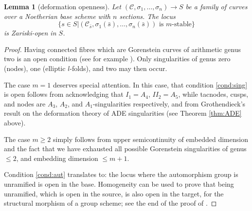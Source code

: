 \documentclass[11pt]{amsart}
\renewcommand{\to}{\rightarrow}
\theoremstyle{plain}
\newtheorem{lem}[thm]{Lemma}
\theoremstyle{definition}
\begin{document}
\begin{lem}[deformation openness]
 Let $(\mathcal C,\sigma_1,\ldots,\sigma_n)\to S$ be a family of curves over a Noetherian base scheme with $n$ sections. The locus \[\{s\in S|(\mathcal C_{\bar s},\sigma_1(\bar s),\ldots,\sigma_n(\bar s)) \text{ is } m\text{-stable}\}\] is Zariski-open in $S$.
\end{lem}
\begin{proof}
 Having connected fibres which are Gorenstein curves of arithmetic genus two is an open condition (see for example \cite[\href{https://stacks.math.columbia.edu/tag/0E1M}{Tag 0E1M}]{stacks-project}). Only singularities of genus zero (nodes), one (elliptic $l$-folds), and two may then occur.
 
 The case $m=1$ deserves special attention. In this case, that condition \eqref{cond:sing} is open follows from acknowledging that $I_1=A_4$, $I\!I_2=A_5$, while tacnodes, cusps, and nodes are $A_3$, $A_2$, and $A_1$-singularities respectively, and from Grothendieck's result on the deformation theory of ADE singularities (see Theorem \ref{thm:ADE} above).
 
 The case $m\geq 2$ simply follows from upper semicontinuity of embedded dimension and the fact that we have exhausted all possible Gorenstein singularities of genus $\leq 2$, and embedding dimension $\leq m+1$.
 
 Condition \eqref{cond:aut} translates to: the locus where the automorphism group is unramified is open in the base. Homogeneity can be used to prove that being unramified, which is open in the source, is also open in the target, for the structural morphism of a group scheme; see the end of the proof of \cite[Lemma 3.10]{SMY1}.
 

\end{proof}
\end{document}

